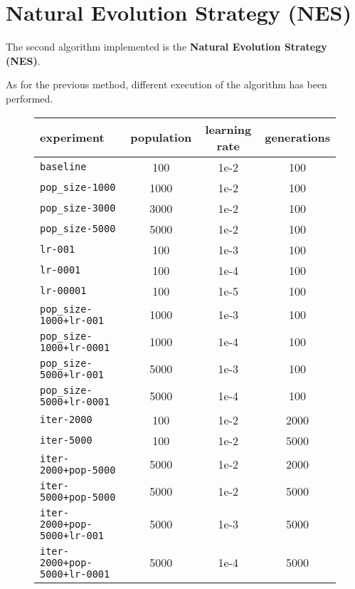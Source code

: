 \section{Natural Evolution Strategy (NES)}

The second algorithm implemented is the \textbf{Natural Evolution Strategy (NES)}. 

As for the previous method, different execution of the algorithm has been performed. 

\begin{figure}[htb]
	\centering
	
	\begin{tabular}{lccc}
		\toprule
		\textbf{experiment}  & \textbf{population} & \textbf{learning rate} &
		\textbf{generations} \\
		\midrule
		\texttt{baseline 						} & 100 	& 1e-2 	& 100\\
		\texttt{pop\_size-1000 					} & 1000 	& 1e-2 	& 100\\
		\texttt{pop\_size-3000 					} & 3000 	& 1e-2 	& 100\\
		\texttt{pop\_size-5000 					} & 5000 	& 1e-2 	& 100\\
		\texttt{lr-001 							} & 100 	& 1e-3 	& 100\\
		\texttt{lr-0001	 						} & 100 	& 1e-4 	& 100\\
		\texttt{lr-00001	 					} & 100 	& 1e-5 	& 100\\
		\texttt{pop\_size-1000+lr-001 			} & 1000 	& 1e-3 	& 100\\
		\texttt{pop\_size-1000+lr-0001 			} & 1000 	& 1e-4 	& 100\\
		\texttt{pop\_size-5000+lr-001 			} & 5000 	& 1e-3 	& 100\\
		\texttt{pop\_size-5000+lr-0001 			} & 5000 	& 1e-4 	& 100\\
		\texttt{iter-2000 						} & 100 	& 1e-2 	& 2000\\
		\texttt{iter-5000 						} & 100 	& 1e-2 	& 5000\\
		\texttt{iter-2000+pop-5000 	}			 & 5000 	& 1e-2 	& 2000\\
		\texttt{iter-5000+pop-5000 	}			 & 5000 	& 1e-2 	& 5000\\
		\texttt{iter-2000+pop-5000+lr-001 }		 & 5000 	& 1e-3 	& 5000\\
		\texttt{iter-2000+pop-5000+lr-0001 }	 & 5000 	& 1e-4 	& 5000\\
		\bottomrule
	\end{tabular}
	\label{tab:nes-param}
\end{figure}


